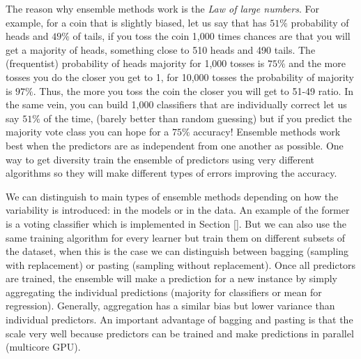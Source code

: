 \documentclass[11pt]{article}
\begin{document}
The reason why ensemble methods work is the \emph{Law of large numbers}. For example, for a coin that is slightly biased, let us say that has $51\%$ probability of heads and $49\%$ of tails, if you toss the coin 1,000 times chances are that you will get a majority of heads, something close to 510 heads and 490 tails. The (frequentist) probability of heads majority for 1,000 tosses is $75\%$ and the more tosses you do the closer you get to 1, for 10,000 tosses the probability of majority is $97\%$. Thus, the more you toss the coin the closer you will get to 51-49 ratio. In the same vein, you can build 1,000 classifiers that are individually correct let us say $51\%$ of the time, (barely better than random guessing) but if you predict the majority vote class you can hope for a $75\%$ accuracy! Ensemble methods work best when the predictors are as independent from one another as possible. One way to get diversity train the ensemble of predictors  using very different algorithms so they will make different types of errors improving the accuracy.\cite{geron2017hands}

We can distinguish to main types of ensemble methods depending on how the variability is introduced: in the models or in the data. An example of the former is a voting  classifier which is implemented in Section \ref{}. But we can also use the same training algorithm for every learner but train them on different subsets of the dataset, when this is the case we can distinguish between bagging (sampling with replacement) or pasting (sampling without replacement). Once all predictors are trained, the ensemble will make a prediction for a new instance by simply aggregating the individual predictions (majority for classifiers or mean for regression). Generally, aggregation has a similar bias but lower variance than individual predictors. An important advantage of bagging and pasting is that the scale very well because predictors can be trained and make predictions in parallel (multicore GPU).
\end{document}
